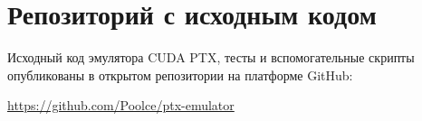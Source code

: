 \section{Репозиторий с исходным кодом}
\label{app:repository}

Исходный код эмулятора CUDA PTX, тесты и вспомогательные скрипты
опубликованы в открытом репозитории на платформе GitHub:

\begin{center}
  \url{https://github.com/Poolce/ptx-emulator}
\end{center}

